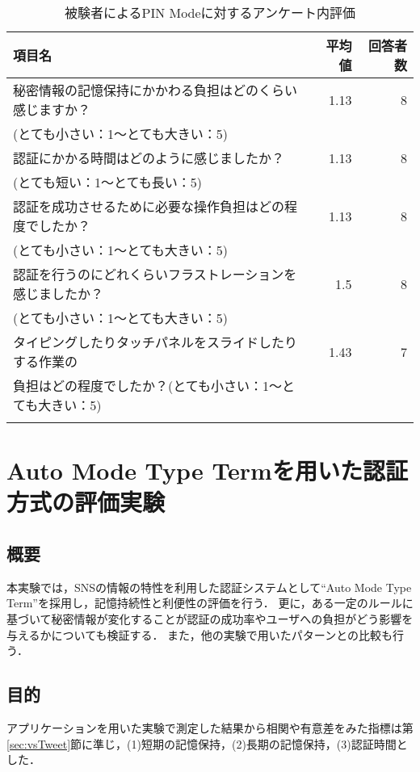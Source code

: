 \begin{table}[b]
  \caption{被験者によるPIN Modeに対するアンケート内評価}
  \label{tab:pin.enquete}
  \begin{center}
    \small
    \begin{tabular}{lrr}
      \bhline
      項目名 & 平均値 & 回答者数 \\ \hline
      秘密情報の記憶保持にかかわる負担はどのくらい感じますか？ & 1.13 & 8 \\
      (とても小さい：1〜とても大きい：5) & & \\
      認証にかかる時間はどのように感じましたか？ & 1.13 & 8 \\
      (とても短い：1〜とても長い：5) & & \\
      認証を成功させるために必要な操作負担はどの程度でしたか？ & 1.13 & 8 \\
      (とても小さい：1〜とても大きい：5) & & \\
      認証を行うのにどれくらいフラストレーションを感じましたか？ & 1.5 & 8 \\
      (とても小さい：1〜とても大きい：5) & & \\
      タイピングしたりタッチパネルをスライドしたりする作業の & 1.43 & 7 \\
      負担はどの程度でしたか？(とても小さい：1〜とても大きい：5) & & \\
      \bhline
    \end{tabular}
  \end{center}
\end{table}

\section{Auto Mode Type Termを用いた認証方式の評価実験}\label{sec:vsTerm}
\subsection{概要}
本実験では，SNSの情報の特性を利用した認証システムとして``Auto Mode Type Term''を採用し，記憶持続性と利便性の評価を行う．
更に，ある一定のルールに基づいて秘密情報が変化することが認証の成功率やユーザへの負担がどう影響を与えるかについても検証する．
また，他の実験で用いたパターンとの比較も行う．

\subsection{目的}
アプリケーションを用いた実験で測定した結果から相関や有意差をみた指標は第\ref{sec:vsTweet}節に準じ，(1)短期の記憶保持，(2)長期の記憶保持，(3)認証時間とした．

